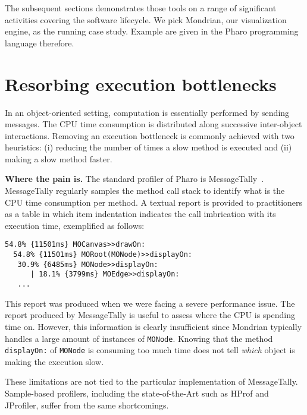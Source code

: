 \documentclass[runningheads]{llncs}
\newcommand{\ct}{\lstinline[backgroundcolor=\color{white},basicstyle=\footnotesize\ttfamily]}
\newcommand{\seclabel}[1]{\label{sec:#1}}
\newcommand{\myparagraph}[1]{\noindent \textbf{#1.}}
\begin{document}
The subsequent sections demonstrates those tools on a range of significant activities covering the software lifecycle. We pick Mondrian, our visualization engine, as the running case study. Example are given in the Pharo programming language therefore.



\section{Resorbing execution bottlenecks}\seclabel{profilingblueprint}

In an object-oriented setting, computation is essentially performed by sending messages. The CPU time consumption is distributed along successive inter-object interactions. Removing an execution bottleneck is commonly achieved with two heuristics: (i) reducing the number of times a slow method is executed and (ii) making a slow method faster.

\myparagraph{Where the pain is} The standard profiler of Pharo is MessageTally~\cite{Berg11d}. MessageTally regularly samples the method call stack to identify what is the CPU time consumption per method. A textual report is provided to practitioners as a table in which item indentation indicates the call imbrication with its execution time, exemplified as follows: 

\begin{lstlisting}
54.8% {11501ms} MOCanvas>>drawOn: 
  54.8% {11501ms} MORoot(MONode)>>displayOn: 
   30.9% {6485ms} MONode>>displayOn: 
      | 18.1% {3799ms} MOEdge>>displayOn: 
   ...
\end{lstlisting}

This report was produced when we were facing a severe performance issue. The report produced by MessageTally is useful to assess where the CPU is spending time on.
However, this information is clearly insufficient since Mondrian typically handles a large amount of instances of \ct{MONode}. Knowing that the method \ct{displayOn:} of \ct{MONode} is consuming too much time does not tell \emph{which} object is making the execution slow. 

These limitations are not tied to the particular implementation of MessageTally. Sample-based profilers, including the state-of-the-Art such as HProf and JProfiler, suffer from the same shortcomings. 
\\
\end{document}
